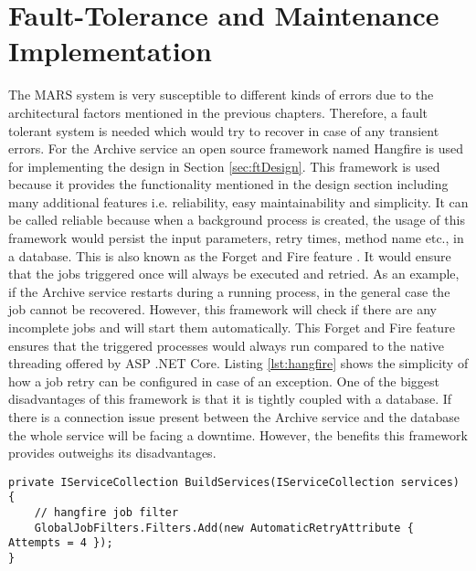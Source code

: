 \newpage
\section{Fault-Tolerance and Maintenance Implementation}
The MARS system is very susceptible to different kinds of errors due to the architectural factors mentioned in the previous chapters. Therefore, a fault tolerant
system is needed which would try to recover in case of any transient errors. For the Archive service an open source framework
named Hangfire is used for implementing the design in Section \ref{sec:ftDesign}. This framework is used because it provides
the functionality mentioned in the design section including many additional features i.e. reliability, easy maintainability and simplicity. It can be called
reliable because when a background process is created, the usage of this framework would persist the input parameters, retry times, method name etc., in a database. 
This is also known as the Forget and Fire feature \cite{Hangfire}. It would
ensure that the jobs triggered once will always be executed and retried. As an example, if the
Archive service restarts during a running process, in the general case the job cannot be recovered. However, this framework will check if 
there are any incomplete jobs and will start them automatically. This Forget and Fire 
feature ensures that the triggered processes would always run compared to the native threading offered by ASP .NET Core.
Listing \ref{lst:hangfire}
shows the simplicity of how a job retry can be configured in case of an exception. One of the biggest disadvantages of this framework is that it is 
tightly coupled
with a database. If there is a connection issue present between the Archive service and the database the whole service will be facing a downtime. However, the 
benefits this framework provides outweighs its disadvantages.

\begin{lstlisting}[language={[Sharp]C}, caption={Hangfire retry attempt configuration}, captionpos=b,label={lst:hangfire}]
private IServiceCollection BuildServices(IServiceCollection services)
{
    // hangfire job filter
    GlobalJobFilters.Filters.Add(new AutomaticRetryAttribute { Attempts = 4 });
}
\end{lstlisting}

